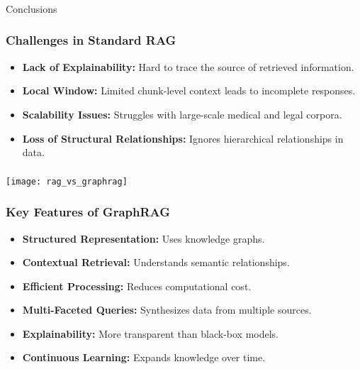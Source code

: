 \begin{frame}[fragile]\frametitle{}
\begin{center}
{\Large Conclusions}
\end{center}
\end{frame}

\begin{frame}[fragile]\frametitle{Challenges in Standard RAG}
    \begin{itemize}
        \item \textbf{Lack of Explainability:} Hard to trace the source of retrieved information.
        \item \textbf{Local Window:} Limited chunk-level context leads to incomplete responses.
        \item \textbf{Scalability Issues:} Struggles with large-scale medical and legal corpora.
        \item \textbf{Loss of Structural Relationships:} Ignores hierarchical relationships in data.
    \end{itemize}
\end{frame}


\begin{frame}[fragile]\frametitle{}

	\begin{center}
	\texttt{[image: rag\_vs\_graphrag]}
	\end{center}
	
\end{frame}


\begin{frame}[fragile]\frametitle{Key Features of GraphRAG}
    \begin{itemize}
        \item \textbf{Structured Representation:} Uses knowledge graphs.
        \item \textbf{Contextual Retrieval:} Understands semantic relationships.
        \item \textbf{Efficient Processing:} Reduces computational cost.
        \item \textbf{Multi-Faceted Queries:} Synthesizes data from multiple sources.
        \item \textbf{Explainability:} More transparent than black-box models.
        \item \textbf{Continuous Learning:} Expands knowledge over time.
    \end{itemize}
\end{frame}

